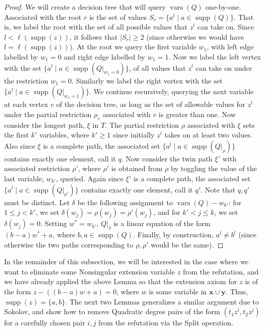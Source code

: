 \documentclass[10pt,a4paper]{article}
\DeclareMathOperator{\supp}{supp}
\DeclareMathOperator{\vars}{vars}
\begin{document}
\begin{proof}
We will create a decision tree that will query $\vars(Q)$ one-by-one. Associated with the root $r$ is the set of values $S_r=\{a^l\mid a\in\supp(Q)\}$. That is, we label the root with the set of all possible values that $z^l$ can take on. Since $l<\ell(\supp(z))$, it follows that $|S_r|\geq2$ (since otherwise we would have $l=\ell(\supp(z))$). At the root we query the first variable $w_1$, with left edge labelled by $w_1=0$ and right edge labelled by $w_1=1$. Now we label the left vertex with the set $\{a^l\mid a\in\supp(Q|_{w_1=0})\}$, of all values that $z^l$ can take on under the restriction $w_1=0$. Similarly we label the right vertex with the set $\{a^l\mid a\in\supp(Q|_{w_1=1})\}$. We continue recursively, querying the next variable at each vertex $v$ of the decision tree, as long as the set of allowable values for $z^l$ under the partial restriction $\rho_v$ associated with $v$ is greater than one. Now consider the longest path, $\xi$ in $T$. The partial restriction $\rho$ associated with $\xi$ sets the first $k'$ variables, where $k'\geq1$ since initially $z^l$ takes on at least two values. Also since $\xi$ is a complete path, the associated set $\{a^l\mid a\in\supp(Q|_{\rho})\}$ contains exactly one element, call it $q$.
Now consider the twin path $\xi'$ with associated restriction $\rho'$, where $\rho'$ is obtained from $\rho$ by toggling the value of the last variable, $w_{k'}$, queried. Again since $\xi'$ is a complete path, the associated set $\{a^l\mid a\in\supp(Q|_{\rho'})\}$ contains exactly one element, call it $q'$. Note that $q,q'$ must be distinct.
Let $\delta$ be the following assignment to $\vars(Q)-w_{k'}$: for $1\leq j<k'$, we set $\delta(w_j)=\rho(w_j)=\rho'(w_j)$, and for $k'<j\leq k$, we set $\delta(w_j)=0$. Setting $w^*=w_{k'}$, $Q|_{\delta}$ is a linear equation of the form $(b-a)w^*+a$, where $b,a\in\supp(Q)$. Finally, by construction, $a^l\neq b^l$ (since otherwise the two paths corresponding to $\rho,\rho'$ would be the same).
\end{proof}
In the remainder of this subsection, we will be interested in the case where we want to eliminate some Nonsingular extension variable $z$ from the refutation, and we have already applied the above Lemma so that the extension axiom for $z$ is of the form $z-((b-a)w+a)=0$, where $w$ is some variable in $\mathbf x\cup\mathbf y$. Thus, $\supp(z)=\{a,b\}$. The next two Lemmas generalizes a similar argument due to Sokolov, and show how to remove Quadratic degree pairs of the form $(t_1z^i,t_2z^j)$ for a carefully chosen pair $i,j$ from the refutation via the Split operation.
\end{document}
